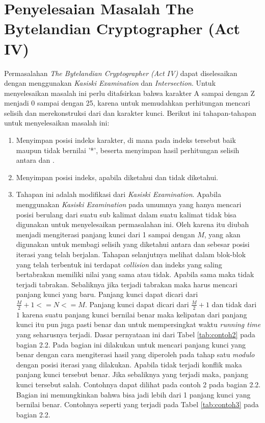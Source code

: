 	\section{Penyelesaian Masalah The Bytelandian Cryptographer (Act IV)}
	\label{chapter:solving}
	Permasalahan \textit{The Bytelandian Cryptographer (Act IV)} dapat diselesaikan dengan menggunakan \textit{Kasiski Examination} dan \textit{Intersection}. Untuk menyelesaikan masalah ini perlu ditafsirkan bahwa karakter A sampai dengan Z menjadi 0 sampai dengan 25, karena untuk memudahkan perhitungan mencari selisih dan merekonstruksi \plaintext dari \ciphertext dan karakter kunci. Berikut ini tahapan-tahapan untuk menyelesaikan masalah ini:
	\begin{enumerate}
	\item Menyimpan posisi indeks karakter, di mana pada indeks tersebut baik \ciphertext maupun \plaintext tidak bernilai '*', beserta menyimpan hasil perhitungan selisih antara \ciphertext dan \plaintext\cite{john_jones_spoj_2009}.
	\item Menyimpan posisi indeks, apabila  \ciphertext diketahui dan \plaintext tidak diketahui\cite{john_jones_spoj_2009}.
	\item Tahapan ini adalah modifikasi dari \textit{Kasiski Examination}. Apabila menggunakan \textit{Kasiski Examination} pada umumnya yang hanya mencari posisi berulang dari suatu sub kalimat dalam suatu kalimat tidak bisa digunakan untuk menyelesaikan permasalahan ini. Oleh karena itu diubah menjadi mengiterasi panjang kunci dari 1 sampai dengan $M$, yang akan digunakan untuk membagi selisih yang diketahui antara \plaintext dan \ciphertext sebesar posisi iterasi yang telah berjalan. Tahapan selanjutnya melihat dalam blok-blok yang telah terbentuk ini terdapat \textit{collision} dan indeks yang saling bertabrakan memiliki nilai yang sama atau tidak. Apabila sama maka tidak terjadi tabrakan. Sebaliknya jika terjadi tabrakan maka harus mencari panjang kunci yang baru. Panjang kunci dapat dicari dari $\frac{M}{2}+1<=N<=M$. Panjang kunci dapat dicari dari $\frac{M}{2}+1$ dan tidak dari $1$ karena suatu panjang kunci bernilai benar maka kelipatan dari panjang kunci itu pun juga pasti benar dan untuk mempersingkat waktu \textit{running time} yang seharusnya terjadi. Dasar pernyataan ini dari Tabel  \ref{tab:contoh2} pada bagian 2.2. Pada bagian ini dilakukan untuk mencari panjang kunci yang benar dengan cara mengiterasi hasil yang diperoleh pada tahap satu \textit{modulo} dengan posisi iterasi yang dilakukan. Apabila tidak terjadi konflik maka panjang kunci tersebut benar. Jika sebaliknya yang terjadi maka, panjang kunci tersebut salah. Contohnya dapat dilihat pada contoh 2 pada bagian 2.2. Bagian ini memungkinkan bahwa bisa jadi lebih dari 1 panjang kunci yang bernilai benar. Contohnya seperti yang terjadi pada Tabel \ref{tab:contoh3} pada bagian 2.2. 

\end{enumerate}
